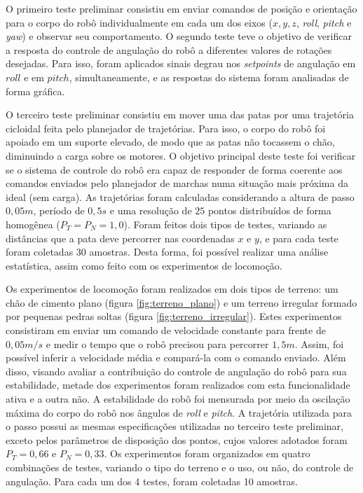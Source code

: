 \documentclass[conference]{IEEEtran}
\begin{document}
  O primeiro teste preliminar consistiu em enviar comandos de posição e orientação para o corpo do robô individualmente em cada um dos eixos ($x, y, z$, \textit{roll}, \textit{pitch} e \textit{yaw}) e observar seu comportamento. O segundo teste teve o objetivo de verificar a resposta do controle de angulação do robô a diferentes valores de rotações desejadas. Para isso, foram aplicados sinais degrau nos \textit{setpoints} de angulação em $roll$ e em $pitch$, simultaneamente, e as respostas do sistema foram analisadas de forma gráfica.
  
  O terceiro teste preliminar consistiu em mover uma das patas por uma trajetória cicloidal feita pelo planejador de trajetórias. Para isso, o corpo do robô foi apoiado em um suporte elevado, de modo que as patas não tocassem o chão, diminuindo a carga sobre os motores. O objetivo principal deste teste foi verificar se o sistema de controle do robô era capaz de responder de forma coerente aos comandos enviados pelo planejador de marchas numa situação mais próxima da ideal (sem carga). As trajetórias foram calculadas considerando a altura de passo $0,05 m$, período de $0,5 s$ e uma resolução de $25$ pontos distribuídos de forma homogênea ($P_T = P_N = 1,0$). Foram feitos dois tipos de testes, variando as distâncias que a pata deve percorrer nas coordenadas $x$ e $y$, e para cada teste foram coletadas 30 amostras. Desta forma, foi possível realizar uma análise estatística, assim como feito com os experimentos de locomoção.
  
  Os experimentos de locomoção foram realizados em dois tipos de terreno: um chão de cimento plano (figura \ref{fig:terreno_plano}) e um terreno irregular formado por pequenas pedras soltas (figura \ref{fig:terreno_irregular}). Estes experimentos consistiram em enviar um comando de velocidade constante para frente de $0,05 m/s$ e medir o tempo que o robô precisou para percorrer $1,5 m$. Assim, foi possível inferir a velocidade média e compará-la com o comando enviado. Além disso, visando avaliar a contribuição do controle de angulação do robô para sua estabilidade, metade dos experimentos foram realizados com esta funcionalidade ativa e a outra não. A estabilidade do robô foi mensurada por meio da oscilação máxima do corpo do robô nos ângulos de \textit{roll} e \textit{pitch}. A trajetória utilizada para o passo possui as mesmas especificações utilizadas no terceiro teste preliminar, exceto pelos parâmetros de disposição dos pontos, cujos valores adotados foram $P_T = 0,66$ e $P_N = 0,33$. Os experimentos foram organizados em quatro combinações de testes, variando o tipo do terreno e o uso, ou não, do controle de angulação. Para cada um dos 4 testes, foram coletadas 10 amostras.
\end{document}
